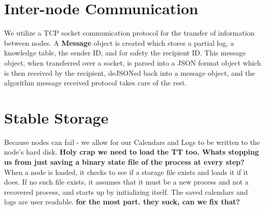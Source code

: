 \documentclass[11pt]{article} %
\newcommand{\note}[1]{{\color{red}\textbf{#1}}}
\begin{document}
\section{Inter-node Communication}
We utilize a TCP socket communication protocol for the transfer of information between nodes. A \textbf{Message} object is created which stores a partial log, a knowledge table, the sender ID, and for safety the recipient ID. This message object, when transferred over a socket, is parsed into a JSON format object which is then received by the recipient, deJSONed back into a message object, and the algorithm message received protocol takes care of the rest.

\section{Stable Storage}
Because nodes can fail - we allow for our Calendars and Logs to be written to the node's hard disk. \note{Holy crap we need to load the TT too. Whats stopping us from just saving a binary state file of the process at every step?} When a node is loaded, it checks to see if a storage file exists and loads it if it does. If no such file exists, it assumes that it must be a new process and not a recovered process, and starts up by initializing itself. The saved calendars and logs are user readable. \note{for the most part. they suck, can we fix that?}
\end{document}
